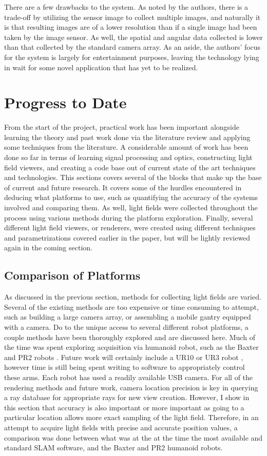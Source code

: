 \documentclass[12pt]{report}
\begin{document}
There are a few drawbacks to the system. As noted by the authors, there is a trade-off by utilizing the sensor image to collect multiple images, and naturally it is that resulting images are of a lower resolution than if a single image had been taken by the image sensor. As well, the spatial and angular data collected is lower than that collected by the standard camera array. As an aside, the authors' focus for the system is largely for entertainment purposes, leaving the technology lying in wait for some novel application that has yet to be realized.

\chapter{Progress to Date}
From the start of the project, practical work has been important alongside learning the theory and past work done via the literature review and applying some techniques from the literature. A considerable amount of work has been done so far in terms of learning signal processing and optics, constructing light field viewers, and creating a code base out of current state of the art techniques and technologies. This sections covers several of the blocks that make up the base of current and future research. It covers some of the hurdles encountered in deducing what platforms to use, such as quantifying the accuracy of the systems involved and comparing them. As well, light fields were collected throughout the process using various methods during the platform exploration. Finally, several different light field viewers, or renderers, were created using different techniques and parametrizations covered earlier in the paper, but will be lightly reviewed again in the coming section.

\section{Comparison of Platforms}
As discussed in the previous section, methods for collecting light fields are varied. Several of the existing methods are too expensive or time consuming to attempt, such as building a large camera array, or assembling a mobile gantry equipped with a camera. Do to the unique access to several different robot platforms, a couple methods have been thoroughly explored and are discussed here. Much of the time was spent exploring acquisition via humanoid robot, such as the Baxter and PR2 robots \cite{baxter, PR2}. Future work will certainly include a UR10 or UR3 robot \cite{UR10}, however time is still being spent writing to software to appropriately control these arms. Each robot has used a readily available USB camera. For all of the rendering methods and future work, camera location precision is key in querying a ray database for appropriate rays for new view creation. However, I show in this section that accuracy is also important or more important as going to a particular location allows more exact sampling of the light field. Therefore, in an attempt to acquire light fields with precise and accurate position values, a comparison was done between what was at the at the time the most available and standard SLAM software, and the Baxter and PR2 humanoid robots. 
\end{document}
